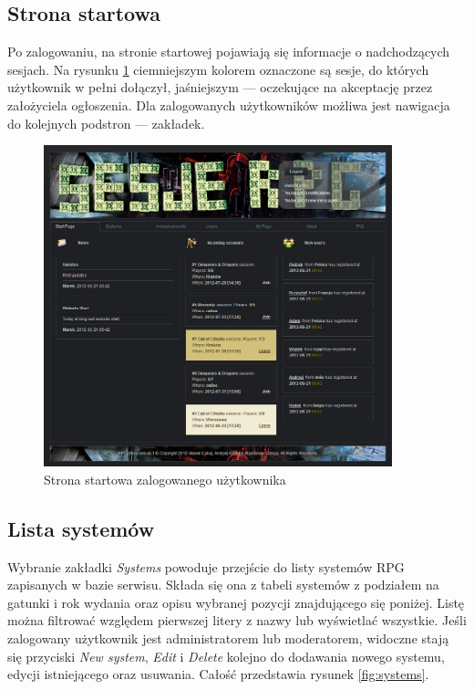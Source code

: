 \subsection{Strona startowa}
\label{sec:start_page}

Po zalogowaniu, na stronie startowej pojawiają się informacje o nadchodzących sesjach. Na rysunku \ref{fig:start_page_joined} ciemniejszym kolorem oznaczone są sesje, do których użytkownik w pełni dołączył, jaśniejszym --- oczekujące na akceptację przez założyciela ogłoszenia. Dla zalogowanych użytkowników możliwa jest nawigacja do kolejnych podstron --- zakładek.
\begin{figure}[htb]	
\centering
\includegraphics[width=0.9\textwidth]{./img/interfejsy/start_page_joined}
\caption{Strona startowa zalogowanego użytkownika}
\label{fig:start_page_joined}
\end{figure}

\subsection{Lista systemów}
\label{sec:systems}
Wybranie zakładki \emph{Systems} powoduje przejście do listy systemów RPG zapisanych w bazie serwisu. Składa się ona z tabeli systemów z podziałem na gatunki i rok wydania oraz opisu wybranej pozycji znajdującego się poniżej. Listę można filtrować względem pierwszej litery z nazwy lub wyświetlać wszystkie. Jeśli zalogowany użytkownik jest administratorem lub moderatorem, widoczne stają się przyciski \emph{New system}, \emph{Edit} i \emph{Delete} kolejno do dodawania nowego systemu, edycji istniejącego oraz usuwania. Całość przedstawia rysunek \ref{fig:systems}.

